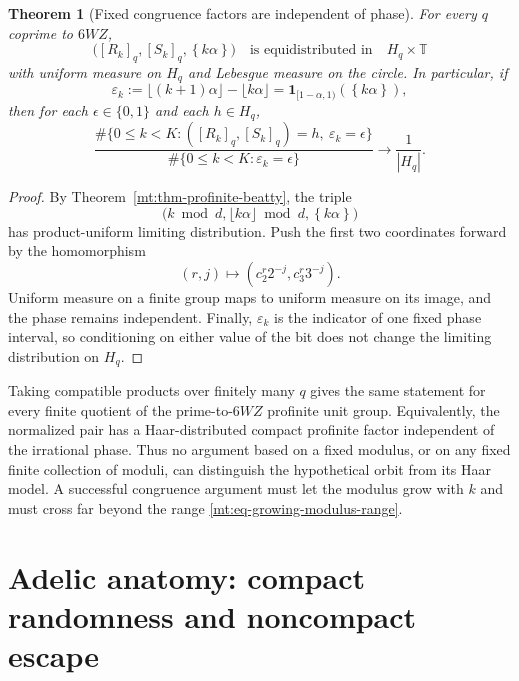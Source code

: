 \documentclass[11pt,oneside]{article}
\newtheorem{theorem}{Theorem}[section]
\theoremstyle{definition}
\theoremstyle{remark}
\newcommand{\Torus}{\mathbb T}
\newcommand{\fract}[1]{\left\{#1\right\}}
\begin{document}
\begin{theorem}[Fixed congruence factors are independent of phase]
\label{mt:thm-fixed-congruence}
For every $q$ coprime to $6WZ$,
\begin{equation}
 \bigl([R_k]_q,[S_k]_q,\fract{k\alpha}\bigr)
 \quad\text{is equidistributed in}\quad
 H_q\times\Torus
 \label{mt:eq-fixed-congruence-law}
\end{equation}
with uniform measure on $H_q$ and Lebesgue measure on the circle.  In particular, if
\begin{equation}
 \varepsilon_k:=\lfloor(k+1)\alpha\rfloor-\lfloor k\alpha\rfloor
 =\mathbf1_{[1-\alpha,1)}(\fract{k\alpha}),
 \label{mt:eq-sturmian-bit}
\end{equation}
then for each $\epsilon\in\{0,1\}$ and each $h\in H_q$,
\begin{equation}
 \frac{\#\{0\le k<K:([R_k]_q,[S_k]_q)=h,
                       \ \varepsilon_k=\epsilon\}}
      {\#\{0\le k<K:\varepsilon_k=\epsilon\}}
 \longrightarrow \frac1{|H_q|}.
 \label{mt:eq-bit-congruence-independent}
\end{equation}
\end{theorem}

\begin{proof}
By Theorem~\ref{mt:thm-profinite-beatty}, the triple
\[
 \bigl(k\bmod d,\lfloor k\alpha\rfloor\bmod d,
       \fract{k\alpha}\bigr)
\]
has product-uniform limiting distribution.  Push the first two coordinates forward by the
homomorphism
\[
 (r,j)\longmapsto(c_2^r2^{-j},c_3^r3^{-j}).
\]
Uniform measure on a finite group maps to uniform measure on its image, and the phase remains
independent.  Finally, $\varepsilon_k$ is the indicator of one fixed phase interval, so
conditioning on either value of the bit does not change the limiting distribution on $H_q$.
\end{proof}

Taking compatible products over finitely many $q$ gives the same statement for every finite
quotient of the prime-to-$6WZ$ profinite unit group.  Equivalently, the normalized pair has a
Haar-distributed compact profinite factor independent of the irrational phase.  Thus no
argument based on a fixed modulus, or on any fixed finite collection of moduli, can distinguish
the hypothetical orbit from its Haar model.  A successful congruence argument must let the
modulus grow with $k$ and must cross far beyond the range
\eqref{mt:eq-growing-modulus-range}.

\section{Adelic anatomy: compact randomness and noncompact escape}
\label{mt:sec-adelic}
\end{document}
